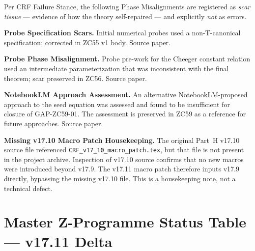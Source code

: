 \documentclass[12pt, a4paper]{article}
\begin{document}
\begin{correctionbox}[title={v17.11 PM Registry}]
Per CRF Failure Stance, the following Phase Misalignments are
registered as \emph{scar tissue} --- evidence of how the theory
self-repaired --- and explicitly \emph{not} as errors.

\begin{description}[leftmargin=1.5em]
\item[\pmdiamond{ZC55-01}] \textbf{Probe Specification Scars.}
  Initial numerical probes used a non-T-canonical specification;
  corrected in ZC55 v1 body. Source paper.

\item[\pmdiamond{ZC56-PROBE-01}] \textbf{Probe Phase Misalignment.}
  Probe pre-work for the Cheeger constant relation used an
  intermediate parameterization that was inconsistent with the
  final theorem; scar preserved in ZC56. Source paper.

\item[\pmdiamond{ZC59-01}] \textbf{NotebookLM Approach Assessment.}
  An alternative NotebookLM-proposed approach to the seed equation
  was assessed and found to be insufficient for closure of
  GAP-ZC59-01. The assessment is preserved in ZC59 as a reference
  for future approaches. Source paper.

\item[\pmdiamond{V17\_10-MACRO}] \textbf{Missing v17.10 Macro Patch
  Housekeeping.} The original Part~H v17.10 source file referenced
  \texttt{CRF\_v17\_10\_macro\_patch.tex}, but that file is not
  present in the project archive. Inspection of v17.10 source
  confirms that no new macros were introduced beyond v17.9. The
  v17.11 macro patch therefore inputs v17.9 directly, bypassing
  the missing v17.10 file. This is a housekeeping note, not a
  technical defect.
\end{description}
\end{correctionbox}

\section{Master Z-Programme Status Table --- v17.11 Delta}
\label{sec:xlii-master}
\end{document}
